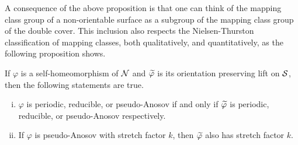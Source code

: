 A consequence of the above proposition is that one can think of the mapping class group of a non-orientable surface
as a subgroup of the mapping class group of the double cover. This inclusion also respects the Nielsen-Thurston
classification of mapping classes, both qualitatively, and quantitatively, as the following proposition shows.
\begin{prop}
  \label{prop:2}
  If $\varphi$ is a self-homeomorphism of $\mathcal{N}$ and $\widetilde{\varphi}$ is its orientation preserving lift on $\mathcal{S}$, then
  the following statements are true.
  \begin{enumerate}[(i)]
  \item $\varphi$ is periodic, reducible, or pseudo-Anosov if and only if $\widetilde{\varphi}$ is periodic, reducible, or pseudo-Anosov
    respectively.
  \item If $\varphi$ is pseudo-Anosov with stretch factor $k$, then $\widetilde{\varphi}$ also has stretch factor $k$.
  \end{enumerate}
\end{prop}
